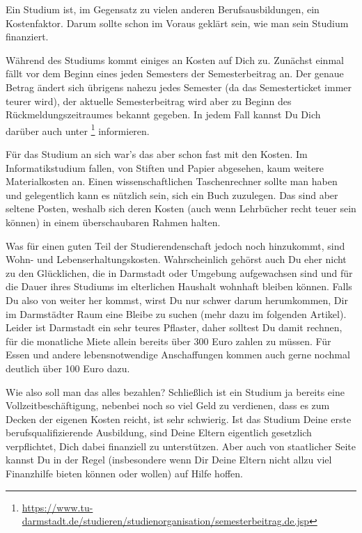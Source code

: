 {Ein Studium ist, im Gegensatz zu vielen anderen Berufsausbildungen, ein Kostenfaktor. Darum sollte schon im Voraus geklärt sein, wie man sein Studium finanziert.
}
{Während des Studiums kommt einiges an Kosten auf Dich zu. Zunächst einmal fällt vor dem Beginn eines jeden Semesters der Semesterbeitrag an. Der genaue Betrag ändert sich übrigens nahezu jedes Semester (da das Semesterticket immer teurer wird), der aktuelle Semesterbeitrag wird aber zu Beginn des Rückmeldungszeitraumes bekannt gegeben. In jedem Fall kannst Du Dich darüber auch unter \footnote{\url{https://www.tu-darmstadt.de/studieren/studienorganisation/semesterbeitrag.de.jsp}} informieren.

    Für das Studium an sich war's das aber schon fast mit den Kosten. Im Informatikstudium fallen, von Stiften und Papier abgesehen, kaum weitere Materialkosten an. Einen wissenschaftlichen Taschenrechner sollte man haben und gelegentlich kann es nützlich sein, sich ein Buch zuzulegen. Das sind aber seltene Posten, weshalb sich deren Kosten (auch wenn Lehrbücher recht teuer sein können) in einem überschaubaren Rahmen halten.

    Was für einen guten Teil der Studierendenschaft jedoch noch hinzukommt, sind Wohn- und Lebenserhaltungskosten. Wahrscheinlich gehörst auch Du eher nicht zu den Glücklichen, die in Darmstadt oder Umgebung aufgewachsen sind und für die Dauer ihres Studiums im elterlichen Haushalt wohnhaft bleiben können. Falls Du also von weiter her kommst, wirst Du nur schwer darum herumkommen, Dir im Darmstädter Raum eine Bleibe zu suchen (mehr dazu im folgenden Artikel). Leider ist Darmstadt ein sehr teures Pflaster, daher solltest Du damit rechnen, für die monatliche Miete allein bereits über 300 Euro zahlen zu müssen. Für Essen und andere lebensnotwendige Anschaffungen kommen auch gerne nochmal deutlich über 100 Euro dazu.

    Wie also soll man das alles bezahlen? Schließlich ist ein Studium ja bereits eine Vollzeitbeschäftigung, nebenbei noch so viel Geld zu verdienen, dass es zum Decken der eigenen Kosten reicht, ist sehr schwierig. Ist das Studium Deine erste berufsqualifizierende Ausbildung, sind Deine Eltern eigentlich gesetzlich verpflichtet, Dich dabei finanziell zu unterstützen. Aber auch von staatlicher Seite kannst Du in der Regel (insbesondere wenn Dir Deine Eltern nicht allzu viel Finanzhilfe bieten können oder wollen) auf Hilfe hoffen.

}
